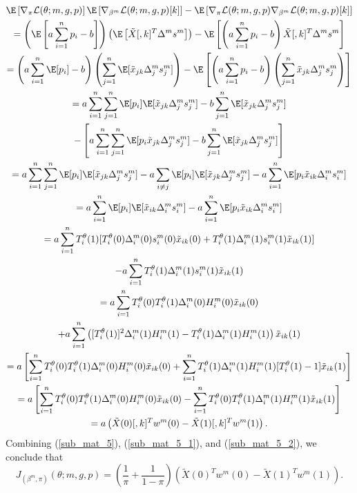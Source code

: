 \documentclass[11pt]{article}
\begin{document}
\begin{appendices}
\begin{refsection}
\begin{multline}
\E \left[\nabla_\pi \mathcal{L}(\theta; m, g, p) \right] \E\left[\nabla_{\beta^m} \mathcal{L}(\theta; m, g, p)[k] \right] - \E \left[\nabla_{\pi}\mathcal{L}(\theta; m,g,p) \nabla_{\beta^m}\mathcal{L}(\theta; m,g,p)[k] \right] \\= \left(\E \left[ a \sum_{i=1}^n p_i - b \right] \right) \left(\E\left[ \tilde{X}[,k]^T \Delta^m s^m \right] \right) - \E \left[ \left( a \sum_{i=1}^n p_i - b \right) \tilde{X}[,k]^T \Delta^m s^m \right] \\ = \left( a \sum_{i=1}^n \E[p_i] - b \right) \left( \sum_{j=1}^n \E [ \tilde{x}_{jk}\Delta^m_js^m_j] \right) - \E \left[ \left( a \sum_{i=1}^n p_i - b \right) \left( \sum_{j=1}^n \tilde{x}_{jk} \Delta^m_j s^m_j \right) \right] \\ = a \sum_{i=1}^n \sum_{j=1}^n \E [p_i] \E[ \tilde{x}_{jk} \Delta^m_j s^m_j] - b \sum_{j=1}^n \E[\tilde{x}_{jk} \Delta^m_j s^m_j] \\ - \left[ a \sum_{i=1}^n \sum_{j=1}^n \E [ p_i \tilde{x}_{jk} \Delta^m_j s^m_j] - b \sum_{j=1}^n \E[\tilde{x}_{jk} \Delta^m_j s^m_j] \right] \\ =  a \sum_{i=1}^n \sum_{j=1}^n \E[p_i] \E[\tilde{x}_{jk} \Delta^m_j s^m_j] - a\sum_{i \neq j} \E[p_i] \E[\tilde{x}_{jk} \Delta^m_j s^m_j] - a\sum_{i=1}^n \E[ p_i \tilde{x}_{ik} \Delta^m_i s^m_i ] \\ = a \sum_{i=1}^n \E[p_i] \E[ \tilde{x}_{ik} \Delta^m_i s^m_i] - a \sum_{i=1}^n \E[p_i \tilde{x}_{ik} \Delta^m_i s^m_i] \\ = a \sum_{i=1}^n T^\theta_i(1) [T^\theta_i(0) \Delta^m_i(0) s^m_i(0) \tilde{x}_{ik}(0) + T^\theta_i(1) \Delta^m_i(1) s^m_i(1) \tilde{x}_{ik}(1)] \\ - a \sum_{i=1}^n T^\theta_i(1)\Delta^m_i(1)s^m_i(1)\tilde{x}_{ik}(1) \\ = a \sum_{i=1}^n T^\theta_i(0)T^\theta_i(1) \Delta_i^m(0)H^m_i(0)\tilde{x}_{ik}(0) \\ + a \sum_{i=1}^n \left( [T^\theta_i(1)]^2 \Delta^m_i(1)H^m_i(1) - T^\theta_i(1)\Delta^m_i(1)H^m_i(1) \right) \tilde{x}_{ik}(1)  \\ =a \left[ \sum_{i=1}^n T^\theta_i(0) T^\theta_i(1) \Delta^m_i(0) H^m_i(0) \tilde{x}_{ik}(0) + \sum_{i=1}^n T^\theta_i(1)\Delta^m_i(1)H^m_i(1)[T^\theta_i(1) - 1] \tilde{x}_{ik}(1) \right] \\ = a \left[ \sum_{i=1}^n T^\theta_i(0) T^\theta_i(1) \Delta^m_i(0) H^m_i(0) \tilde{x}_{ik}(0) - \sum_{i=1}^n T^\theta_i(0) T^\theta_i(1) \Delta^m_i(1) H^m_i(1) \tilde{x}_{ik}(1) \right] \\ = a\left(\tilde{X}(0)[,k]^T w^m(0) - \tilde{X}(1)[,k]^T w^m(1)  \right).
\end{multline}
Combining (\ref{sub_mat_5}), (\ref{sub_mat_5_1}), and (\ref{sub_mat_5_2}), we conclude that
\begin{equation}\label{sub_mat_5_formula} J_{(\beta^m, \pi)}(\theta; m, g, p) = \left( \frac{1}{\pi} + \frac{1}{1 - \pi} \right) \left( \tilde{X}(0)^T w^m(0) - \tilde{X}(1)^T w^m(1)\right). \end{equation}


\end{refsection}
\end{appendices}
\end{document}
